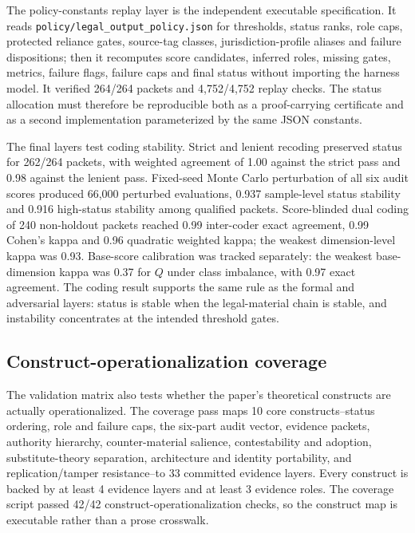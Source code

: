 \documentclass[12pt,a4paper]{article}
\begin{document}
The policy-constants replay layer is the independent executable specification. It reads \texttt{policy/legal\_output\_policy.json} for thresholds, status ranks, role caps, protected reliance gates, source-tag classes, jurisdiction-profile aliases and failure dispositions; then it recomputes score candidates, inferred roles, missing gates, metrics, failure flags, failure caps and final status without importing the harness model. It verified 264/264 packets and 4,752/4,752 replay checks. The status allocation must therefore be reproducible both as a proof-carrying certificate and as a second implementation parameterized by the same JSON constants.

The final layers test coding stability. Strict and lenient recoding preserved status for 262/264 packets, with weighted agreement of 1.00 against the strict pass and 0.98 against the lenient pass. Fixed-seed Monte Carlo perturbation of all six audit scores produced 66,000 perturbed evaluations, 0.937 sample-level status stability and 0.916 high-status stability among qualified packets. Score-blinded dual coding of 240 non-holdout packets reached 0.99 inter-coder exact agreement, 0.99 Cohen's kappa and 0.96 quadratic weighted kappa; the weakest dimension-level kappa was 0.93. Base-score calibration was tracked separately: the weakest base-dimension kappa was 0.37 for $Q$ under class imbalance, with 0.97 exact agreement. The coding result supports the same rule as the formal and adversarial layers: status is stable when the legal-material chain is stable, and instability concentrates at the intended threshold gates.

\subsection{Construct-operationalization coverage}

The validation matrix also tests whether the paper's theoretical constructs are actually operationalized. The coverage pass maps 10 core constructs--status ordering, role and failure caps, the six-part audit vector, evidence packets, authority hierarchy, counter-material salience, contestability and adoption, substitute-theory separation, architecture and identity portability, and replication/tamper resistance--to 33 committed evidence layers. Every construct is backed by at least 4 evidence layers and at least 3 evidence roles. The coverage script passed 42/42 construct-operationalization checks, so the construct map is executable rather than a prose crosswalk.
\end{document}
